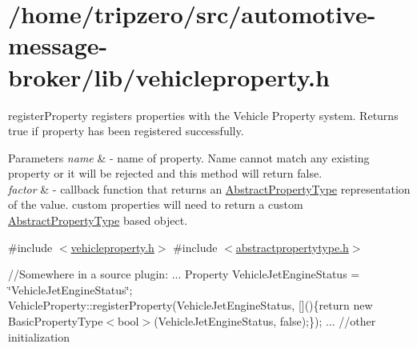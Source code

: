 \hypertarget{_2home_2tripzero_2src_2automotive-message-broker_2lib_2vehicleproperty_8h-example}{\section{/home/tripzero/src/automotive-\/message-\/broker/lib/vehicleproperty.\-h}
}
register\-Property registers properties with the Vehicle Property system. Returns true if property has been registered successfully. 
\begin{DoxyParams}{Parameters}
{\em name} & -\/ name of property. Name cannot match any existing property or it will be rejected and this method will return false. \\
\hline
{\em factor} & -\/ callback function that returns an \hyperlink{classAbstractPropertyType}{Abstract\-Property\-Type} representation of the value. custom properties will need to return a custom \hyperlink{classAbstractPropertyType}{Abstract\-Property\-Type} based object.\\
\hline
\end{DoxyParams}
\#include $<$\hyperlink{vehicleproperty_8h_source}{vehicleproperty.\-h}$>$ \#include $<$\hyperlink{abstractpropertytype_8h_source}{abstractpropertytype.\-h}$>$

//\-Somewhere in a source plugin\-: ... Property Vehicle\-Jet\-Engine\-Status = \char`\"{}\-Vehicle\-Jet\-Engine\-Status\char`\"{}; Vehicle\-Property\-::register\-Property(Vehicle\-Jet\-Engine\-Status, \mbox{[}\mbox{]}()\{return new Basic\-Property\-Type$<$bool$>$(\-Vehicle\-Jet\-Engine\-Status, false);\}); ... //other initialization


\begin{DoxyCodeInclude}
\end{DoxyCodeInclude}
 